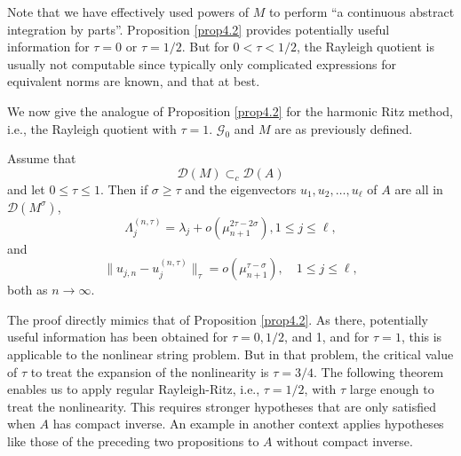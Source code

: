 \documentclass[final]{siamltex}
\numberwithin{equation}{section}
\begin{document}
Note that we have effectively used powers of $M$ to perform ``a continuous abstract integration by parts''. Proposition \ref{prop4.2} provides potentially useful information for $\tau=0$ or $\tau=1/2$. But for $0<\tau<1/2$, the Rayleigh quotient is usually not computable since typically only complicated expressions for equivalent norms are known, and that at best.

We now give the analogue of Proposition \ref{prop4.2} for the harmonic Ritz method, i.e., the Rayleigh quotient with $\tau=1$. $\mathcal{G}_0$ and $M$ are as previously defined.

\begin{proposition} \label{prop4.4}
Assume that
\begin{equation} \label{4.4}
\mathcal{D}\left(M\right) \subset_{c} \mathcal{D}\left(A\right)
\end{equation}
and let $0 \le \tau \le 1$. Then if $\sigma \ge \tau$ and the eigenvectors $u_1, u_2, \ldots, u_{\ell}$ of $A$ are all in $\mathcal{D}\left(M^{\sigma} \right)$,
\[\Lambda_{j}^{(n, \tau)} = \lambda_j + o \left(\mu_{n+1}^{2 \tau - 2 \sigma}\right), 1 \le j \le \ell, \]
and
\[\|u_{j,n} - u_j^{(n,\tau)}\|_{\tau}= o\left(\mu_{n+1}^{\tau-
\sigma}\right), \quad 1\le j \le \ell,\]
both as $n\to \infty$.
\end{proposition}

The proof directly mimics that of Proposition \ref{prop4.2}. As there, potentially useful information has been obtained for $\tau=0, 1/2$, and 1, and for $\tau=1$, this is applicable to the nonlinear string problem. But in that problem, the critical value of $\tau$ to treat the expansion of the nonlinearity is $\tau=3/4$. The following theorem enables us to apply regular Rayleigh-Ritz, i.e., $\tau=1/2$, with $\tau$ large enough to treat the nonlinearity. This requires stronger hypotheses that are only satisfied when $A$ has compact inverse. An example in another context \cite{Beattie-Greenlee}
applies hypotheses like those of the preceding two propositions to $A$ without compact inverse.
\end{document}

